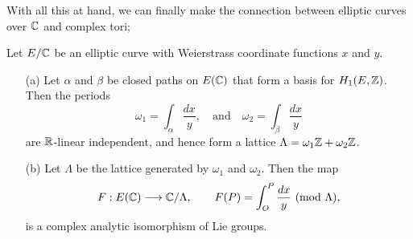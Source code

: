 With all this at hand, we can finally make the connection between elliptic curves over $\mathbb{C}$ and complex tori;\\

\begin{prop}
	Let $E/\mathbb{C}$ be an elliptic curve with Weierstrass coordinate functions $x$ and $y$.
	\begin{enumerate}
		\item[(a)] Let $\alpha$ and $\beta$ be closed paths on $E(\mathbb{C})$ that form a basis for $H_{1}(E,\mathbb{Z})$. Then the periods
		\begin{equation*}
			\omega_{1} = \int_{\alpha}\frac{dx}{y},\quad\text{and}\quad\omega_{2} = \int_{\beta}\frac{dx}{y}
		\end{equation*}
		are $\mathbb{R}$-linear independent, and hence form a lattice $\Lambda = \omega_{1}\mathbb{Z} + \omega_{2}\mathbb{Z}$.
		\item[(b)] Let $\Lambda$ be the lattice generated by $\omega_{1}$ and $\omega_{2}$. Then the map
		\begin{equation*}
			F:E(\mathbb{C}) \longrightarrow \mathbb{C}/\Lambda,\qquad F(P) = \int_{O}^{P}\frac{dx}{y}\ (\text{mod }\Lambda),
		\end{equation*}
		is a complex analytic isomorphism of Lie groups.
	\end{enumerate}
\end{prop}


